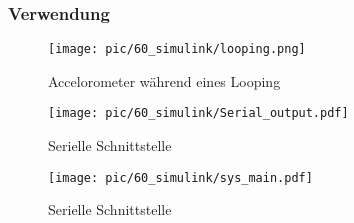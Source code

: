 \subsubsection{Verwendung}

\begin{figure}[ht]
  \begin{center}
  \texttt{[image: pic/60\_simulink/looping.png]}
  \caption{Accelorometer während eines Looping}
  \label{fig:accel_looping}
  \end{center}
\end{figure}


\begin{figure}[ht]
  \begin{center}
  \texttt{[image: pic/60\_simulink/Serial\_output.pdf]}
  \caption{Serielle Schnittstelle}
  \label{fig:Serielle Schnittstelle}
  \end{center}
\end{figure}



\begin{figure}[ht]
  \begin{center}
  \texttt{[image: pic/60\_simulink/sys\_main.pdf]}
  \caption{Serielle Schnittstelle}
  \label{fig:Serielle Schnittstelle}
  \end{center}
\end{figure}



\clearpage
